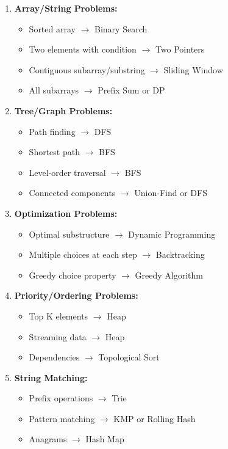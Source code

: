 \documentclass[10pt,a4paper]{article}
\begin{document}
\begin{enumerate}
\item \textbf{Array/String Problems:}
   \begin{itemize}
   \item Sorted array $\rightarrow$ Binary Search
   \item Two elements with condition $\rightarrow$ Two Pointers
   \item Contiguous subarray/substring $\rightarrow$ Sliding Window
   \item All subarrays $\rightarrow$ Prefix Sum or DP
   \end{itemize}

\item \textbf{Tree/Graph Problems:}
   \begin{itemize}
   \item Path finding $\rightarrow$ DFS
   \item Shortest path $\rightarrow$ BFS
   \item Level-order traversal $\rightarrow$ BFS
   \item Connected components $\rightarrow$ Union-Find or DFS
   \end{itemize}

\item \textbf{Optimization Problems:}
   \begin{itemize}
   \item Optimal substructure $\rightarrow$ Dynamic Programming
   \item Multiple choices at each step $\rightarrow$ Backtracking
   \item Greedy choice property $\rightarrow$ Greedy Algorithm
   \end{itemize}

\item \textbf{Priority/Ordering Problems:}
   \begin{itemize}
   \item Top K elements $\rightarrow$ Heap
   \item Streaming data $\rightarrow$ Heap
   \item Dependencies $\rightarrow$ Topological Sort
   \end{itemize}

\item \textbf{String Matching:}
   \begin{itemize}
   \item Prefix operations $\rightarrow$ Trie
   \item Pattern matching $\rightarrow$ KMP or Rolling Hash
   \item Anagrams $\rightarrow$ Hash Map
   \end{itemize}
\end{enumerate}
\end{document}
